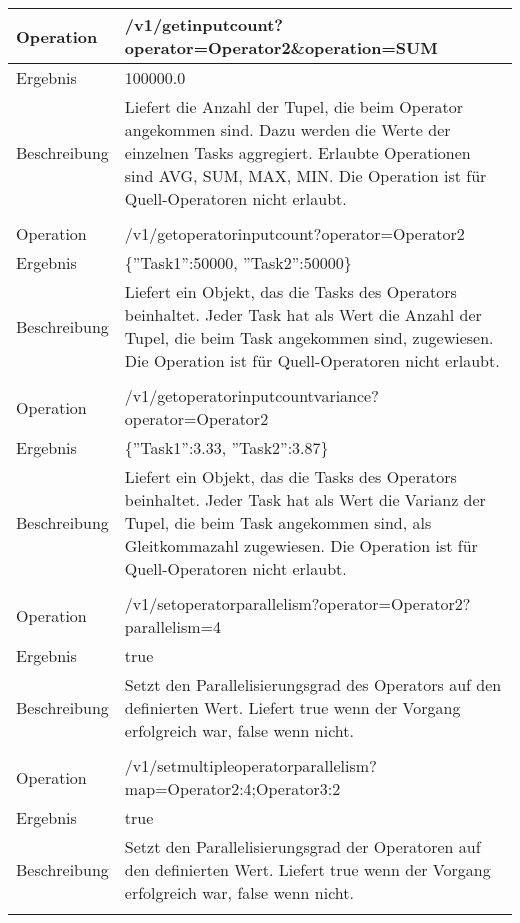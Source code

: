 \begin{longtable}{|p{2cm}|p{12cm}|}
Operation & /v1/getinputcount?operator=Operator2\&operation=SUM \\ \hline
Ergebnis & 100000.0 \\ \hline
Beschreibung & Liefert die Anzahl der Tupel, die beim Operator angekommen sind. Dazu werden die Werte der einzelnen Tasks aggregiert. Erlaubte Operationen sind AVG, SUM, MAX, MIN. Die Operation ist für Quell-Operatoren nicht erlaubt.\\ \hline
\multicolumn{2}{|l|}{} \\ \hline

Operation & /v1/getoperatorinputcount?operator=Operator2 \\ \hline
Ergebnis & \{''Task1'':50000, ''Task2'':50000\} \\ \hline
Beschreibung & Liefert ein Objekt, das die Tasks des Operators beinhaltet. Jeder Task hat als Wert die Anzahl der Tupel, die beim Task angekommen sind, zugewiesen. Die Operation ist für Quell-Operatoren nicht erlaubt.\\ \hline
\multicolumn{2}{|l|}{} \\ \hline

Operation & /v1/getoperatorinputcountvariance?operator=Operator2 \\ \hline
Ergebnis & \{''Task1'':3.33, ''Task2'':3.87\} \\ \hline
Beschreibung & Liefert ein Objekt, das die Tasks des Operators beinhaltet. Jeder Task hat als Wert die Varianz der Tupel, die beim Task angekommen sind, als Gleitkommazahl zugewiesen. Die Operation ist für Quell-Operatoren nicht erlaubt. \\ \hline
\multicolumn{2}{|l|}{} \\ \hline

Operation & /v1/setoperatorparallelism?operator=Operator2?parallelism=4 \\ \hline
Ergebnis & true \\ \hline
Beschreibung & Setzt den Parallelisierungsgrad des Operators auf den definierten Wert. Liefert true wenn der Vorgang erfolgreich war, false wenn nicht. \\ \hline
\multicolumn{2}{|l|}{} \\ \hline

Operation & /v1/setmultipleoperatorparallelism?map=Operator2:4;Operator3:2 \\ \hline
Ergebnis & true \\ \hline
Beschreibung & Setzt den Parallelisierungsgrad der Operatoren auf den definierten Wert. Liefert true wenn der Vorgang erfolgreich war, false wenn nicht. \\ \hline
\multicolumn{2}{|l|}{} \\ \hline

\end{longtable}









